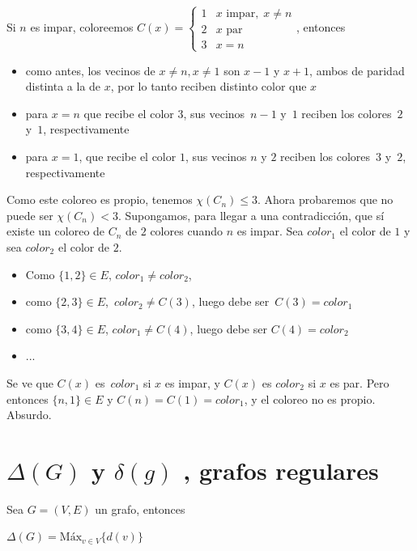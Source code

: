 \documentclass[10pt,a4paper]{article}
\begin{document}
Si $n$ es impar, coloreemos $C(x) = 
\begin{cases}
1 & x \text{ impar}, \;x\neq n\\
2 & x \text{ par }\\
3 & x = n
\end{cases}$, entonces

\begin{itemize}

	\item como antes, los vecinos de $x\neq n, x\neq 1$ son $x-1$ y $x +1$, ambos de paridad distinta a la de $x$, por lo tanto reciben distinto color que $x$
	\item para $x=n$ que recibe el color $3$, sus vecinos $n-1$ y $1$ reciben los colores $2$ y $1$, respectivamente
	\item para $x=1$, que recibe el color $1$, sus vecinos $n$ y $2$ reciben los colores $3$ y $2$, respectivamente
\end{itemize}

Como este coloreo es propio, tenemos $\chi(C_n) \leq 3$. Ahora probaremos que no puede ser $\chi(C_n) < 3$. Supongamos, para llegar a una contradicción, que sí existe un coloreo de $C_n$ de $2$ colores cuando $n$ es impar. Sea $color_1$ el color de $1$ y sea $color_2$ el color de $2$.

\begin{itemize}

	\item Como $\{1, 2\} \in E$, $color_1 \neq color_2$,
	\item como $\{2, 3\}\in E$, $color_2 \neq C(3)$, luego debe ser $C(3) = color_1$
	\item como $\{3, 4\} \in E$, $color_1\neq C(4)$, luego debe ser $C(4) = color_2$
	\item ...
\end{itemize}

Se ve que $C(x)$ es $color_1$ si $x$ es impar, y $C(x) $ es $color_2$ si $x$ es par. Pero entonces $\{n, 1\} \in E$ y $C(n) = C(1) = color_1$, y el coloreo no es propio. Absurdo.

\section*{$\Delta(G)$ y $\delta(g)$ , grafos regulares}

Sea $G=(V, E)$ un grafo, entonces

\begin{center}
$\Delta(G) = \text{Máx}_{v \in V}\{d(v)\}$
\end{center}
\end{document}
